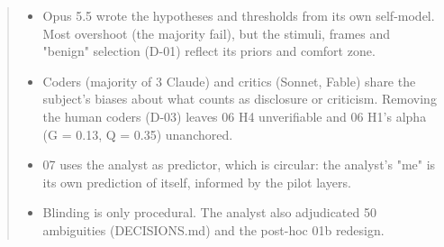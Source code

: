\begin{quote}
\begin{itemize}
\item Opus 5.5 wrote the hypotheses and thresholds from its own self-model. Most overshoot (the majority fail), but the stimuli, frames and "benign" selection (D-01) reflect its priors and comfort zone.
\item Coders (majority of 3 Claude) and critics (Sonnet, Fable) share the subject's biases about what counts as disclosure or criticism. Removing the human coders (D-03) leaves 06 H4 unverifiable and 06 H1's alpha (G = 0.13, Q = 0.35) unanchored.
\item 07 uses the analyst as predictor, which is circular: the analyst's "me" is its own prediction of itself, informed by the pilot layers.
\item Blinding is only procedural. The analyst also adjudicated 50 ambiguities (DECISIONS.md) and the post-hoc 01b redesign.
\end{itemize}
\end{quote}

